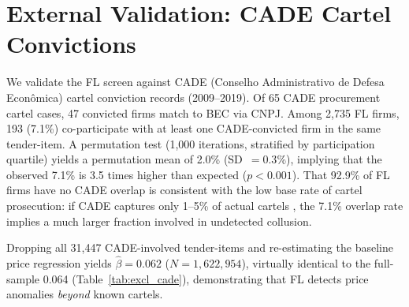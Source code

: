 \section{External Validation: CADE Cartel Convictions}
\label{sec:cade}

We validate the FL screen against CADE (Conselho Administrativo de
Defesa Econ\^omica) cartel conviction records (2009--2019). Of 65
CADE procurement cartel cases, 47 convicted firms match to BEC via
CNPJ. Among 2,735 FL firms, 193 (7.1\%) co-participate with at least
one CADE-convicted firm in the same tender-item. A permutation test
(1,000 iterations, stratified by participation quartile) yields a
permutation mean of 2.0\% (SD~$= 0.3$\%), implying that the observed
7.1\% is 3.5 times higher than expected ($p < 0.001$). That 92.9\%
of FL firms have no CADE overlap is consistent with the low base rate
of cartel prosecution: if CADE captures only 1--5\% of actual cartels
\citep{connor2007price}, the 7.1\% overlap rate implies a much larger
fraction involved in undetected collusion.

Dropping all 31,447 CADE-involved tender-items and re-estimating the
baseline price regression yields $\hat{\beta} = 0.062$ ($N =
1{,}622{,}954$), virtually identical to the full-sample 0.064
(Table~\ref{tab:excl_cade}), demonstrating that FL detects price
anomalies \emph{beyond} known cartels.

